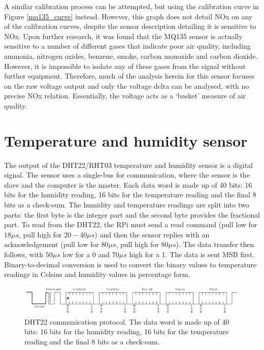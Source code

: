 \documentclass[11pt]{report}
\begin{document}
A similar calibration process can be attempted, but using the calibration curve in Figure \ref{mq135_curve} instead. However, this graph does not detail NOx on any of the calibration curves, despite the sensor description detailing it is sensitive to NOx. Upon further research, it was found that the MQ135 sensor is actually sensitive to a number of different gases that indicate poor air quality, including ammonia, nitrogen oxides, benzene, smoke, carbon monoxide and carbon dioxide. However, it is impossible to isolate any of these gases from the signal without further equipment. Therefore, much of the analysis herein for this sensor focuses on the raw voltage output and only the voltage delta can be analysed, with no precise NOx relation. Essentially, the voltage acts as a `basket' measure of air quality.

\section{Temperature and humidity sensor}

The output of the DHT22/RHT03 temperature and humidity sensor is a digital signal. The sensor uses a single-bus for communication, where the sensor is the slave and the computer is the master. Each data word is made up of 40 bits: 16 bits for the humidity reading, 16 bits for the temperature reading and the final 8 bits as a check-sum. The humidity and temperature readings are split into two parts: the first byte is the integer part and the second byte provides the fractional part. To read from the DHT22, the RPi must send a read command (pull low for $18\mu s$, pull high for $20-40\mu s$) and then the sensor replies with an acknowledgement (pull low for $80\mu s$, pull high for $80\mu s$). The data transfer then follows, with $50\mu s$ low for a 0 and $70\mu s$ high for a 1. The data is sent MSB first. Binary-to-decimal conversion is used to convert the binary values to temperature readings in Celsius and humidity values in percentage form.

\begin{figure}[!tb]
\centering
\includegraphics[width=1\textwidth]{images/dht22_data}
\caption[DHT22 communication protocol.]{DHT22 communication protocol. The data word is made up of 40 bits: 16 bits for the humidity reading, 16 bits for the temperature reading and the final 8 bits as a check-sum.}
\label{dht22_data}
\end{figure}
\end{document}

